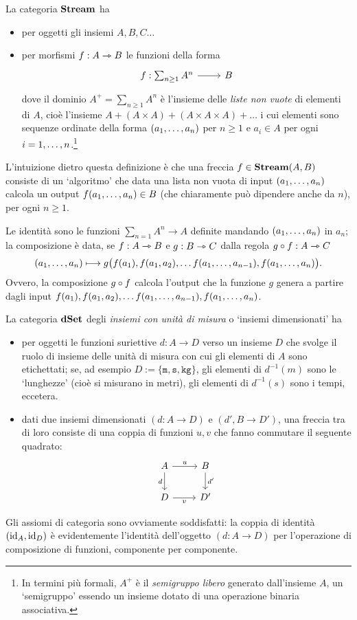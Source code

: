 \begin{example}\label{example_streams}
	La categoria \(\mathbf{Stream}\) ha
	\begin{itemize}
		\item per oggetti gli insiemi \(A,B,C\dots\)
		\item per morfismi \(f : A\rightarrowtriangle B\) le funzioni della forma
		      \[\longmor{f : \sum_{n\ge1} A^n}{B}\]
		      dove il dominio \(A^+=\sum_{n\ge1} A^n\) è l'insieme delle \emph{liste non vuote} di elementi di \(A\), cioè l'insieme \(A + (A\times A) + (A\times A\times A) + \dots\) i cui elementi sono sequenze ordinate della forma \((\tup an,)\) per \(n\ge 1\) e \(a_i\in A\) per ogni \(i=\iter n\).\footnote{In termini più formali, \(A^+\) è il \emph{semigruppo libero} generato dall'insieme \(A\), un `semigruppo' essendo un insieme dotato di una operazione binaria associativa.}
	\end{itemize}
	L'intuizione dietro questa definizione è che una freccia \(f \in \mathbf{Stream}(A,B)\) consiste di un `algoritmo' che data una lista non vuota di input \((\tup an,)\) calcola un output \(f(\tup an,)\in B\) (che chiaramente può dipendere anche da \(n\)), per ogni \(n\ge 1\).

	Le identità sono le funzioni \(\sum_{n=1} A^n\to A\) definite mandando \((\tup an,)\) in \(a_n\); la composizione è data, se \(f : A\rightarrowtriangle B\) e \(g : B\rightarrowtriangle C\) dalla regola \(g\circ f : A\rightarrowtriangle C\)
	\[(\tup an,)\longmapsto g\big(f(a_1),f(a_1,a_2),\dots f(\tup a{n-1},),f(\tup an,)\big).\]
	Ovvero, la composizione \(g\circ f\) calcola l'output che la funzione \(g\) genera a partire dagli input \(f(a_1),f(a_1,a_2),\dots f(\tup a{n-1},),f(\tup an,)\).
\end{example}
\begin{example}\label{example_dimensionati}
	La categoria \(\mathbf{dSet}\) degli \emph{insiemi con unità di misura} o `insiemi dimensionati' ha
	\begin{itemize}
		\item per oggetti le funzioni suriettive \(d : A\to D\) verso un insieme \(D\) che svolge il ruolo di insieme delle unità di misura con cui gli elementi di \(A\) sono etichettati; se, ad esempio \(D := \{\texttt{m},\texttt{s},\texttt{kg}\}\), gli elementi di \(d^{-1}(m)\) sono le `lunghezze' (cioè si misurano in metri), gli elementi di \(d^{-1}(s)\) sono i tempi, eccetera.
		\item dati due insiemi dimensionati \((d : A\to D)\) e \((d', B\to D')\), una freccia tra di loro consiste di una coppia di funzioni \(u,v\) che fanno commutare il seguente quadrato:
		      \[\begin{tikzcd}
				      A\ar[r, "u"]\ar[d,"d"'] & B \ar[d, "d'"]\\
				      D \ar[r, "v"']& D'
			      \end{tikzcd}\]
	\end{itemize}
	Gli assiomi di categoria sono ovviamente soddisfatti: la coppia di identità \((\mathrm{id}_A,\mathrm{id}_D)\) è evidentemente l'identità dell'oggetto \((d : A\to D)\) per l'operazione di composizione di funzioni, componente per componente.
\end{example}
